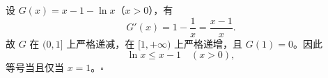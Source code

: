 设 $G(x)=x-1-\ln x$（$x>0$），有
\[
G'(x)=1-\frac1x=\frac{x-1}{x}.
\]
故 $G$ 在 $(0,1]$ 上严格递减，在 $[1,+\infty)$ 上严格递增，且 $G(1)=0$。因此
\[
\boxed{\ln x\le x-1\quad(x>0)},
\]
等号当且仅当 $x=1$。$\square$
